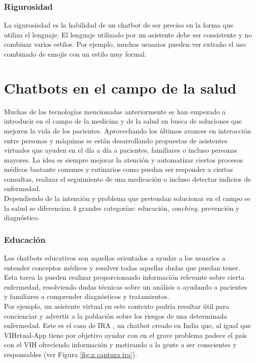 \subsubsection{Rigurosidad}
La sigurosisdad es la habilidad de un chatbot de ser preciso en la forma que utiliza el lenguaje. El lenguaje utilizado por un asistente debe ser consistente y no combinar varios estilos. Por ejemplo, muchos usuarios pueden ver extraño el uso combinado de emojis con un estilo muy formal.

\section{Chatbots en el campo de la salud}
Muchas de las tecnologías mencionadas anteriormente se han empezado a introducir en el campo de la medicina y de la salud en busca de soluciones que mejoren la vida de los pacientes. Aprovechando los últimos avances en interacción entre personas y máquinas  se están desarrollando propuestas de asistentes virtuales que ayuden en el día a día a pacientes, familiares o incluso personas mayores. La idea es siempre mejorar la atención y automatizar ciertos procesos médicos \cite{healthAgents} bastante comunes y rutinarios como puedan ser responder a ciertas consultas, realizar el seguimiento de una medicación o incluso detectar indicios de enfermedad. \\

Dependiendo de la intención y problema que pretendan solucionar en el campo se la salud se diferencian 4 grandes categorías: educación, \textit{coaching}, prevención y diagnóstico.\\

\subsubsection{Educación}
Los chatbots educativos son aquellos orientados a ayudar a los usuarios a entender conceptos médicos y resolver todas aquellas dudas que puedan tener. Esta tarea la pueden realizar proporcionando información relevante sobre cierta enfermedad, resolviendo dudas técnicas sobre un análisis o ayudando a pacientes y familiares a comprender diagnósticos y tratamientos. \\

Por ejemplo, un asistente virtual en este contexto podría resultar útil para  concienciar y advertir a la población sobre los riesgos de una determinada enfermedad. Este es el caso de IRA \cite{ira}, un chatbot creado en India que, al igual que VIHrtual-App tiene por objetivo ayudar con en el grave problema padece el país con el VIH ofreciendo información y motivando a la gente a ser conscientes y responsables (ver Figura \ref{fig:x captura ira}).\\

